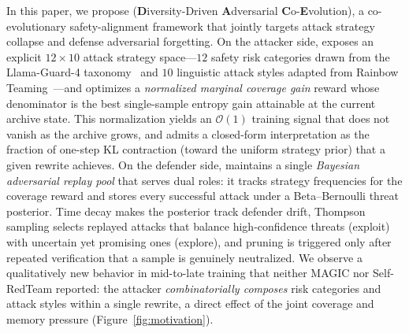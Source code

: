 In this paper, we propose \textbf{\method} (\textbf{D}iversity-Driven \textbf{A}dversarial \textbf{C}o-\textbf{E}volution), a co-evolutionary safety-alignment framework that jointly targets attack strategy collapse and defense adversarial forgetting. On the attacker side, \method exposes an explicit $12\times10$ attack strategy space---$12$ safety risk categories drawn from the Llama-Guard-4 taxonomy~\citep{llamaguard4_2026} and $10$ linguistic attack styles adapted from Rainbow Teaming~\citep{samvelyan2024rainbow}---and optimizes a \emph{normalized marginal coverage gain} reward whose denominator is the best single-sample entropy gain attainable at the current archive state. This normalization yields an $\mathcal{O}(1)$ training signal that does not vanish as the archive grows, and admits a closed-form interpretation as the fraction of one-step KL contraction (toward the uniform strategy prior) that a given rewrite achieves. On the defender side, \method maintains a single \emph{Bayesian adversarial replay pool} that serves dual roles: it tracks strategy frequencies for the coverage reward and stores every successful attack under a Beta--Bernoulli threat posterior. Time decay makes the posterior track defender drift, Thompson sampling selects replayed attacks that balance high-confidence threats (exploit) with uncertain yet promising ones (explore), and pruning is triggered only after repeated verification that a sample is genuinely neutralized. We observe a qualitatively new behavior in mid-to-late training that neither MAGIC nor Self-RedTeam reported: the \method attacker \emph{combinatorially composes} risk categories and attack styles within a single rewrite, a direct effect of the joint coverage and memory pressure (Figure~\ref{fig:motivation}).


